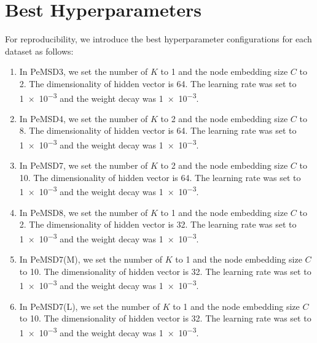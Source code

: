 \documentclass[letterpaper]{article} \usepackage{aaai22}  \usepackage{times}  \usepackage{helvet}  \usepackage{courier}  \usepackage[hyphens]{url}  \usepackage{graphicx} \urlstyle{rm} \def\UrlFont{\rm}  \usepackage{natbib}  \usepackage{caption} \DeclareCaptionStyle{ruled}{labelfont=normalfont,labelsep=colon,strut=off} \frenchspacing  \setlength{\pdfpagewidth}{8.5in}  \setlength{\pdfpageheight}{11in}  \usepackage{stfloats}
\begin{document}
\section{Best Hyperparameters}
For reproducibility, we introduce the best hyperparameter configurations for each dataset as follows:
\begin{enumerate}
    \item In PeMSD3, we set the number of $K$ to 1 and the node embedding size $C$ to 2. The dimensionality of hidden vector is 64. The learning rate was set to \num{1e-3} and the weight decay was \num{1e-3}.
    \item In PeMSD4, we set the number of $K$ to 2 and the node embedding size $C$ to 8. The dimensionality of hidden vector is 64. The learning rate was set to \num{1e-3} and the weight decay was \num{1e-3}.
    \item In PeMSD7, we set the number of $K$ to 2 and the node embedding size $C$ to 10. The dimensionality of hidden vector is 64. The learning rate was set to \num{1e-3} and the weight decay was \num{1e-3}.
    \item In PeMSD8, we set the number of $K$ to 1 and the node embedding size $C$ to 2. The dimensionality of hidden vector is 32. The learning rate was set to \num{1e-3} and the weight decay was \num{1e-3}.
    \item In PeMSD7(M), we set the number of $K$ to 1 and the node embedding size $C$ to 10. The dimensionality of hidden vector is 32. The learning rate was set to \num{1e-3} and the weight decay was \num{1e-3}.
    \item In PeMSD7(L), we set the number of $K$ to 1 and the node embedding size $C$ to 10. The dimensionality of hidden vector is 32. The learning rate was set to \num{1e-3} and the weight decay was \num{1e-3}.
\end{enumerate}
\end{document}
